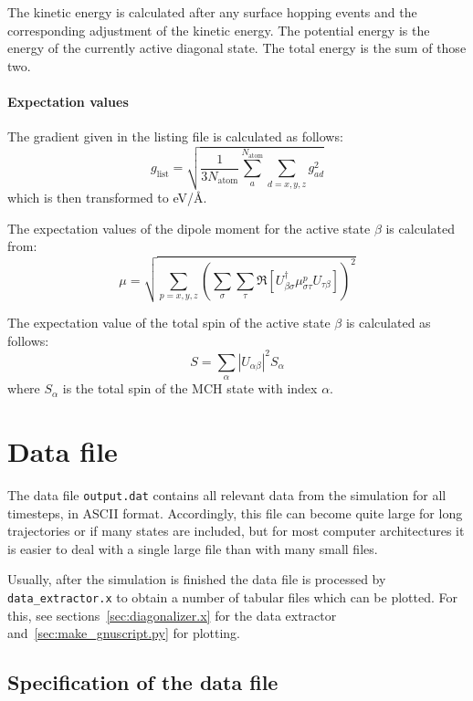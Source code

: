 \documentclass[a4paper,11pt,DIV=15,openany,twoside=false]{scrbook}
\newcommand{\ttt}[1]{\texttt{#1}}
\begin{document}
The kinetic energy is calculated after any surface hopping events and the corresponding adjustment of the kinetic energy. The potential energy is the energy of the currently active diagonal state. The total energy is the sum of those two.

\paragraph{Expectation values}

The gradient given in the listing file is calculated as follows:
\begin{equation}
  g_\text{list}=\sqrt{\frac{1}{3N_\text{atom}}\sum\limits_a^{N_\text{atom}}\sum_{d=x,y,z} g_{ad}^2}
\end{equation}
which is then transformed to eV/\AA.

The expectation values of the dipole moment for the active state $\beta$ is calculated from:
\begin{equation}
  \mu=\sqrt{\sum\limits_{p=x,y,z} 
  \left(
    \sum\limits_\sigma\sum\limits_\tau
    \Re\left[
      U_{\beta\sigma}^\dagger \mu_{\sigma\tau}^p U_{\tau\beta}
    \right]
  \right)^2}
\end{equation}

The expectation value of the total spin of the active state $\beta$ is calculated as follows:
\begin{equation}
  S=\sum_\alpha |U_{\alpha\beta}|^2 S_\alpha
\end{equation}
where $S_\alpha$ is the total spin of the MCH state with index $\alpha$.

\section{Data file}\label{sec:datfile}

The data file \ttt{output.dat} contains all relevant data from the simulation for all timesteps, in ASCII format. Accordingly, this file can become quite large for long trajectories or if many states are included, but for most computer architectures it is easier to deal with a single large file than with many small files.

Usually, after the simulation is finished the data file is processed by \ttt{data\_extractor.x} to obtain a number of tabular files which can be plotted. For this, see sections~\ref{sec:diagonalizer.x} for the data extractor and~\ref{sec:make_gnuscript.py} for plotting.

\subsection{Specification of the data file}
\end{document}
